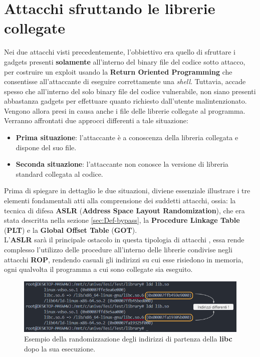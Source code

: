 \section{Attacchi sfruttando le librerie collegate}
\label{sec:Attack_3}
Nei due attacchi visti precedentemente, l'obbiettivo era quello di sfruttare i gadgets presenti \textbf{solamente} all'interno del binary file del codice sotto attacco, per costruire un exploit usando la \textbf{Return Oriented Programming} che consentisse all'attaccante di eseguire correttamente una \textit{shell}.
Tuttavia, accade spesso che all'interno del solo binary file del codice vulnerabile, non siano presenti abbastanza gadgets per effettuare quanto richiesto dall'utente malintenzionato. Vengono allora presi in causa anche i file delle librerie collegate al programma. \cite*{Ret2libc}\\
Verranno affrontati due approcci differenti a tale situazione: 
\begin{itemize}
    \item \textbf{Prima situazione}: l'attaccante è a conoscenza della libreria collegata e dispone del suo file.
    \item \textbf{Seconda situazione}: l'attaccante non conosce la versione di libreria standard collegata al codice.  
\end{itemize}
Prima di spiegare in dettaglio le due situazioni, diviene essenziale illustrare i tre elementi fondamentali atti alla comprensione dei suddetti attacchi, ossia: la tecnica di difesa \textbf{ASLR} (\textbf{Address Space Layout Randomization}), che era stata descritta nella sezione \ref{sec:Def-bypass}, la \textbf{Procedure Linkage Table} 
(\textbf{PLT}) e la \textbf{Global Offset Table} (\textbf{GOT}).\\ L'\textbf{ASLR} sarà il principale ostacolo in questa tipologia di attacchi \cite*{ASLR-BYPASS}, essa rende complesso l'utilizzo delle procedure all'interno delle librerie condivise negli attacchi \textbf{ROP}, rendendo casuali gli indirizzi su cui esse risiedono in memoria, ogni qualvolta il programma a cui sono collegate sia eseguito.

\begin{figure}[htpb]
    \centerline{\includegraphics[scale=.8]{images/ASLR-ldd.png}}
    \caption{Esempio della randomizzazione degli indirizzi di partenza della \textbf{libc} dopo la sua esecuzione.}
    \label{fig:ASLR}
\end{figure}

